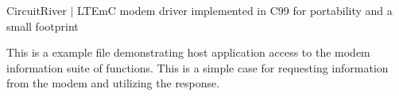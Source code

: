 Circuit\+River $\vert$ LTEmC modem driver implemented in C99 for portability and a small footprint

This is a example file demonstrating host application access to the modem information suite of functions. This is a simple case for requesting information from the modem and utilizing the response. 